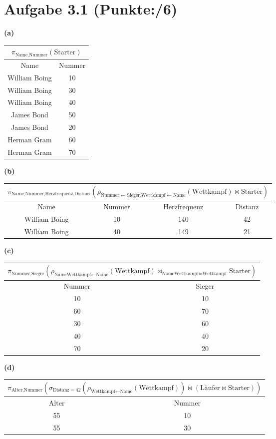 \documentclass[11pt, a4paper]{article}
\newcommand{\blattnummer}{3}
\newcommand{\p}{6}
\newcommand{\aufgabe}[2] {\section*{Aufgabe \blattnummer.#1 (Punkte:\qquad/#2)}}
\newcommand{\aufgabenteil}[1] {\textbf{(#1)}}
\begin{document}
\aufgabe{1}{\p}
\aufgabenteil{a}
\begin{adjustwidth}{20pt}{20pt}
\begin{tabular}{|c c|}\hline
\multicolumn{2}{|c|}{$\pi_{\text{Name,Nummer}}(\text{Starter})$} \\\hline
Name & Nummer \\\hline
William Boing & 10 \\
William Boing & 30 \\
William Boing & 40 \\
James Bond & 50 \\
James Bond & 20 \\
Herman Gram & 60 \\
Herman Gram & 70 \\\hline
\end{tabular}
\end{adjustwidth}
\aufgabenteil{b}
\begin{adjustwidth}{20pt}{20pt}
\begin{tabular}{|c c c c|}\hline
\multicolumn{4}{|c|}{$\pi_{\text{Name,Nummer,Herzfrequenz,Distanz}}(\rho_{\text{Nummer$\leftarrow$Sieger,Wettkampf$\leftarrow$Name}}(\text{Wettkampf})\bowtie \text{Starter})$} \\\hline
Name & Nummer & Herzfrequenz & Distanz \\\hline
William Boing & 10 & 140 & 42 \\
William Boing & 40 & 149 & 21 \\\hline
\end{tabular}
\end{adjustwidth}
\aufgabenteil{c}
\begin{adjustwidth}{20pt}{20pt}
\begin{tabular}{|c c|}\hline
\multicolumn{2}{|c|}{$\pi_{\text{Nummer,Sieger}}(\rho_{\text{NameWettkampf$\leftarrow$Name}}(\text{Wettkampf})\bowtie_{\text{NameWettkampf=Wettkampf}}\text{Starter})$} \\\hline
Nummer & Sieger \\\hline
10 & 10 \\
60 & 70 \\
30 & 60 \\
40 & 40 \\
70 & 20 \\\hline
\end{tabular}
\end{adjustwidth}
\aufgabenteil{d}
\begin{adjustwidth}{20pt}{20pt}
\begin{tabular}{|c c|}\hline
\multicolumn{2}{|c|}{$\pi_{\text{Alter,Nummer}}(\sigma_{\text{Distanz}=42}(\rho_{\text{Wettkampf$\leftarrow$Name}}(\text{Wettkampf}))\bowtie(\text{Läufer$\bowtie$Starter}))$} \\\hline
Alter & Nummer \\\hline
55 & 10 \\
55 & 30 \\\hline
\end{tabular}
\end{adjustwidth}
\end{document}
